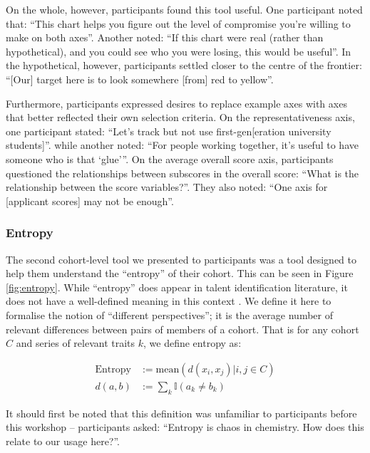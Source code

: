 On the whole, however, participants found this tool useful. One participant noted that: ``This chart helps you figure out the level of compromise you're willing to make on both axes''. Another noted: ``If this chart were real (rather than hypothetical), and you could see who you were losing, this would be useful''. In the hypothetical, however, participants settled closer to the centre of the frontier: ``[Our] target here is to look somewhere [from] red to yellow''.

Furthermore, participants expressed desires to replace example axes with axes that better reflected their own selection criteria. On the representativeness axis, one participant stated: ``Let's track but not use first-gen[eration university students]''. while another noted: ``For people working together, it's useful to have someone who is that `glue'''. On the average overall score axis, participants questioned the relationships between subscores in the overall score: ``What is the relationship between the score variables?''. They also noted: ``One axis for [applicant scores] may not be enough''.

\subsubsection{Entropy}
The second cohort-level tool we presented to participants was a tool designed to help them understand the ``entropy'' of their cohort. This can be seen in Figure \ref{fig:entropy}. While ``entropy'' does appear in talent identification literature, it does not have a well-defined meaning in this context \cite{huppenkothen2020entrofy}. We define it here to formalise the notion of ``different perspectives''; it is the average number of relevant differences between pairs of members of a cohort. That is for any cohort $C$ and series of relevant traits $k$, we define entropy as:

\begin{equation}
\begin{split}
    \text{Entropy} &:= \text{mean}(d(x_i, x_j)| i, j \in C) \\
    d(a, b) &:= \sum_{k} \mathbb{I}(a_k \neq b_k)
\end{split}
\end{equation}

It should first be noted that this definition was unfamiliar to participants before this workshop – participants asked: ``Entropy is chaos in chemistry. How does this relate to our usage here?''.

